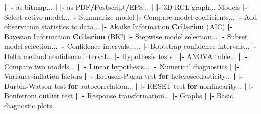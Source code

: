 \documentclass[12pt,]{krantz}
\newenvironment{Shaded}{\begin{snugshade}}{\end{snugshade}}
\newcommand{\ControlFlowTok}[1]{\textcolor[rgb]{0.13,0.29,0.53}{\textbf{#1}}}
\newcommand{\ErrorTok}[1]{\textcolor[rgb]{0.64,0.00,0.00}{\textbf{#1}}}
\newcommand{\KeywordTok}[1]{\textcolor[rgb]{0.13,0.29,0.53}{\textbf{#1}}}
\newcommand{\NormalTok}[1]{#1}
\newcommand{\OperatorTok}[1]{\textcolor[rgb]{0.81,0.36,0.00}{\textbf{#1}}}
\newcommand{\StringTok}[1]{\textcolor[rgb]{0.31,0.60,0.02}{#1}}
\begin{document}
\begin{Shaded}
\begin{Highlighting}[]
  \OperatorTok{|}\StringTok{ }\ErrorTok{|}\OperatorTok{-}\StringTok{ }\NormalTok{as bitmap...}
  \OperatorTok{|}\StringTok{ }\ErrorTok{|}\OperatorTok{-}\StringTok{ }\NormalTok{as PDF}\OperatorTok{/}\NormalTok{Postscript}\OperatorTok{/}\NormalTok{EPS...}
  \OperatorTok{|}\StringTok{ }\ErrorTok{|}\OperatorTok{-}\StringTok{ }\NormalTok{3D RGL graph...}
\NormalTok{Models}
  \OperatorTok{|-}\StringTok{ }\NormalTok{Select active model...}
  \OperatorTok{|-}\StringTok{ }\NormalTok{Summarize model}
  \OperatorTok{|-}\StringTok{ }\NormalTok{Compare model coefficients...}
  \OperatorTok{|-}\StringTok{ }\NormalTok{Add observation statistics to data...}
  \OperatorTok{|-}\StringTok{ }\NormalTok{Akaike Information }\KeywordTok{Criterion}\NormalTok{ (AIC)}
  \OperatorTok{|-}\StringTok{ }\NormalTok{Bayesian Information }\KeywordTok{Criterion}\NormalTok{ (BIC)}
  \OperatorTok{|-}\StringTok{ }\NormalTok{Stepwise model selection...}
  \OperatorTok{|-}\StringTok{ }\NormalTok{Subset model selection...}
  \OperatorTok{|-}\StringTok{ }\NormalTok{Confidence intervals......}
  \OperatorTok{|-}\StringTok{ }\NormalTok{Bootstrap confidence intervals...}
  \OperatorTok{|-}\StringTok{ }\NormalTok{Delta method confidence interval...}
  \OperatorTok{|-}\StringTok{ }\NormalTok{Hypothesis tests}
  \OperatorTok{|}\StringTok{ }\ErrorTok{|}\OperatorTok{-}\StringTok{ }\NormalTok{ANOVA table...}
  \OperatorTok{|}\StringTok{ }\ErrorTok{|}\OperatorTok{-}\StringTok{ }\NormalTok{Compare two models...}
  \OperatorTok{|}\StringTok{ }\ErrorTok{|}\OperatorTok{-}\StringTok{ }\NormalTok{Linear hypothesis...}
  \OperatorTok{|-}\StringTok{ }\NormalTok{Numerical diagnostics}
  \OperatorTok{|}\StringTok{ }\ErrorTok{|}\OperatorTok{-}\StringTok{ }\NormalTok{Variance}\OperatorTok{-}\NormalTok{inflation factors}
  \OperatorTok{|}\StringTok{ }\ErrorTok{|}\OperatorTok{-}\StringTok{ }\NormalTok{Breusch}\OperatorTok{-}\NormalTok{Pagan test }\ControlFlowTok{for}\NormalTok{ heteroscedasticity...}
  \OperatorTok{|}\StringTok{ }\ErrorTok{|}\OperatorTok{-}\StringTok{ }\NormalTok{Durbin}\OperatorTok{-}\NormalTok{Watson test }\ControlFlowTok{for}\NormalTok{ autocorrelation...}
  \OperatorTok{|}\StringTok{ }\ErrorTok{|}\OperatorTok{-}\StringTok{ }\NormalTok{RESET test }\ControlFlowTok{for}\NormalTok{ nonlinearity...}
  \OperatorTok{|}\StringTok{ }\ErrorTok{|}\OperatorTok{-}\StringTok{ }\NormalTok{Bonferroni outlier test}
  \OperatorTok{|}\StringTok{ }\ErrorTok{|}\OperatorTok{-}\StringTok{ }\NormalTok{Response transformation...}
  \OperatorTok{|-}\StringTok{ }\NormalTok{Graphs}
  \OperatorTok{|}\StringTok{ }\ErrorTok{|}\OperatorTok{-}\StringTok{ }\NormalTok{Basic diagnostic plots}

\end{Highlighting}
\end{Shaded}
\end{document}
